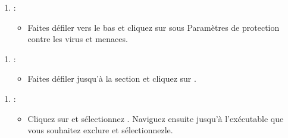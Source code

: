 \documentclass[letterpaper,10pt,french]{sphinxmanual}
\begin{document}
\begin{figure}[htbp]
\centering

\noindent{}
\end{figure}
\begin{enumerate}
%
\setcounter{enumi}{2}
\item {} 
\sphinxAtStartPar
{} :
\begin{itemize}
\item {} 
\sphinxAtStartPar
Faites défiler vers le bas et cliquez sur  sous Paramètres de protection contre les virus et menaces.

\end{itemize}

\end{enumerate}

\begin{figure}[htbp]
\centering

\noindent{}
\end{figure}
\begin{enumerate}
%
\setcounter{enumi}{3}
\item {} 
\sphinxAtStartPar
{} :
\begin{itemize}
\item {} 
\sphinxAtStartPar
Faites défiler jusqu’à la section  et cliquez sur .

\end{itemize}

\end{enumerate}

\begin{figure}[htbp]
\centering

\noindent{}
\end{figure}
\begin{enumerate}
%
\setcounter{enumi}{4}
\item {} 
\sphinxAtStartPar
{} :
\begin{itemize}
\item {} 
\sphinxAtStartPar
Cliquez sur  et sélectionnez . Naviguez ensuite jusqu’à
l’exécutable que vous souhaitez exclure et sélectionnez\sphinxhyphen{}le.

\end{itemize}

\end{enumerate}
\end{document}
